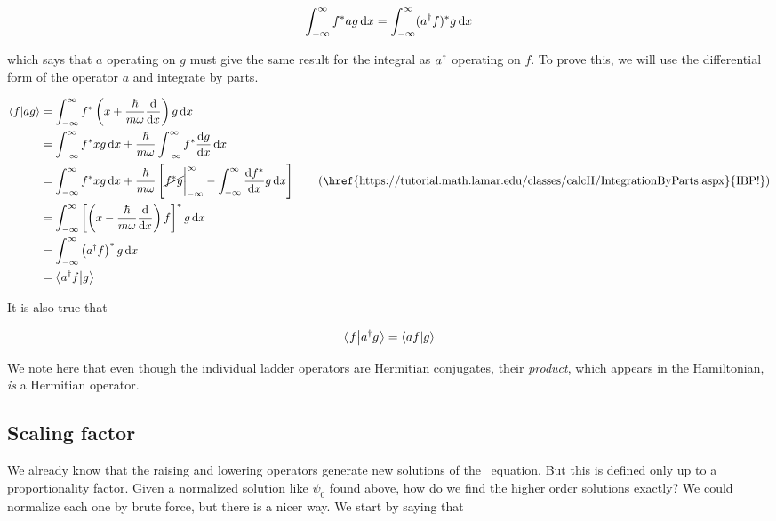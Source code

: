 \begin{equation*}
	\int_{-\infty}^{\infty} f^*ag \dd{x} = \int_{-\infty}^{\infty} (a^{\dagger} f)^*g \dd{x}
\end{equation*}

\noindent which says that $a$ operating on $g$ must give the same result for the integral as $a^{\dagger}$ operating on $f$. 
To prove this, we will use the differential form of the operator $a$ and integrate by parts.

\begin{align*}
	\braket{f}{ag} &= \int_{-\infty}^{\infty} f^* \left(x + \frac{\hbar}{m\omega} \dv{x} \right)g \dd{x} \\
	&= \int_{-\infty}^{\infty} f^*xg \dd{x} + \frac{\hbar}{m\omega} \int_{-\infty}^{\infty} f^* \dv{g}{x} \dd{x} \\
	&= \int_{-\infty}^{\infty} f^*xg \dd{x} + \frac{\hbar}{m\omega} \left[ \cancel{f^*g} \bigg|_{-\infty}^{\infty} - \int_{-\infty}^{\infty} \dv{f^*}{x} g \dd{x} \right] \tag{\href{https://tutorial.math.lamar.edu/classes/calcII/IntegrationByParts.aspx}{IBP!}} \\
	&= \int_{-\infty}^{\infty} \left[ \left(x - \frac{\hbar}{m\omega} \dv{x}\right) f \right]^* g \dd{x} \\
	&= \int_{-\infty}^{\infty} \left(\ad f\right)^*g \dd{x} \\
	&= \braket{\ad f}{g} 
\end{align*}

It is also true that

\begin{equation*}
	\braket{f}{a^{\dagger} g} = \braket{af}{g}
\end{equation*}

We note here that even though the individual ladder operators are Hermitian conjugates, their \emph{product}, which appears in the Hamiltonian, \emph{is} a Hermitian operator.


\subsection{Scaling factor}

We already know that the raising and lowering operators generate new solutions of the \Sch\ equation. 
But this is defined only up to a proportionality factor. 
Given a normalized solution like $\psi_0$ found above, how do we find the higher order solutions exactly? 
We could normalize each one by brute force, but there is a nicer way. 
We start by saying that 

